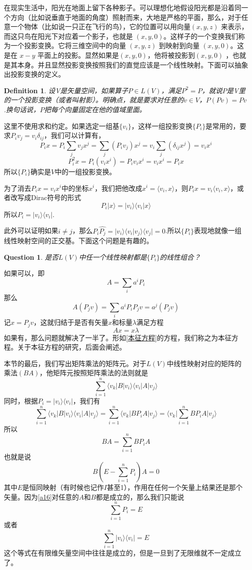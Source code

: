 \documentclass[11pt,a4paper,openany]{book}%
\theoremstyle{plain}%
\newtheorem{que}{Question}[chapter]%
\newtheorem{defi}{Definition}[chapter]%
\begin{document}
在现实生活中，阳光在地面上留下各种影子。可以理想化地假设阳光都是沿着同一个方向（比如说垂直于地面的角度）照射而来，大地是严格的平面，那么，对于任意一个物体（比如说一只正在飞行的鸟），它的位置可以用向量$ (x, y, z)$ 来表示，而这只鸟在阳光下对应着一个影子，也就是 $(x, y, 0)$。这样子的一个变换我们称为一个投影变换。它将三维空间中的向量 $(x, y, z)$ 到映射到向量 $(x, y, 0) $。这是在 $x-y$ 平面上的投影。显然如果是$(x, y, 0)$，他将被投影到$(x, y, 0)$ ，也就是其本身。并且显然投影变换按照我们的直觉应该是一个线性映射。下面可以抽象出投影变换的定义。
\begin{defi}
设V是矢量空间，如果算子$P\in L(V)$，满足$P^2=P$，就说$P$是V里的一个投影变换（或者叫射影）。明确点，就是要求对任意的$v\in V$，$P(Pv)=Pv$.换句话说，$P$把每个向量固定在他的值域里面。
\end{defi}
这里不使用求和约定。如果选定一组基$\{v_i\}$，这样一组投影变换$\{P_i\}$是常用的，要求$P_iv_j=v_i\delta_{ij}$，我们可以计算有，
\[
P_ix=P_i\sum_j v_jx^j=\sum_j(P_iv_j)x^j=v_i\sum_j(\delta_{ij}x^j)=v_ix^i
\]
\[
P_i^2x=P_i(v_ix^i)=P_iv_ix^i=v_ix^i=P_ix
\]
所以$\{P_i\}$确实是$V$中的一组投影变换。

为了消去$P_ix=v_ix^i$中的坐标$x^i$，我们把他改成$x^i=\langle v_i,x \rangle$，则$P_ix=v_i\langle v_i,x \rangle$，或者改写成Dirac符号的形式
\[
P_i|x\rangle=|v_i\rangle\langle v_i|x \rangle
\]
所以$P_i=|v_i\rangle\langle v_i|$.

此外可以证明如果$i\neq j$，那么$P_i\hat{P_j}=|v_i\rangle\langle v_i|v_j\rangle\langle v_j|=0$.所以$\{P_i\}$表现地就像一组线性映射空间的正交基。下面这个问题是有趣的。
\begin{que}
是否$L(V)$中任一个线性映射都是$\{P_i\}$的线性组合？
\end{que}
如果可以，即
\[
A=\sum_i a^iP_i
\]
那么
\[
A(P_jv)=\sum_i a^iP_iP_jv=a^j(P_jv)
\]
记$x=P_jv$，这就归结于是否有矢量$x$和标量$\lambda$满足方程
\begin{equation}
\label{本征方程}
Ax=x\lambda
\end{equation}
如果有，那么问题就解决了一半了。形如\eqref{本征方程}的方程，我们称之为{\kaishu 本征方程}。关于本征方程的研究，后面会阐述。

本节的最后，我们写出矩阵乘法的矩阵元。对于$L(V)$中线性映射对应的矩阵的乘法$(BA)$，他矩阵元按照矩阵乘法的法则就是
\[
\sum_{i=1}^{n}\langle v_k|B|v_i \rangle\langle v_i|A|v_j \rangle
\]
同时，根据$P_i=|v_i\rangle\langle v_i|$，我们有
\[
\sum_{i=1}^{n}\langle v_k|B|v_i \rangle\langle v_i|A|v_j \rangle=
\sum_{i=1}^{n}\langle v_k|BP_iA|v_j \rangle=
\Bigg\langle v_k\Bigg|\sum_{i=1}^{n}BP_iA\Bigg|v_j \Bigg\rangle
\]
所以
\[
BA=\sum_{i=1}^{n}BP_iA
\]
也就是说
\begin{equation}
\label{a16}
B\left(E-\sum_{i=1}^{n}P_i\right)A=0
\end{equation}
其中$E$是恒同映射（有时候也记作$I$甚至1），作用在任何一个矢量上结果还是那个矢量。因为\eqref{a16}对任意的$A$和$B$都是成立的，那么我们只能说
\[
\sum_{i=1}^{n}P_i=E
\]
或者
\[
\sum_{i=1}^{n}|v_i\rangle\langle v_i|=E
\]
这个等式在有限维矢量空间中往往是成立的，但是一旦到了无限维就不一定成立了。
\end{document}
